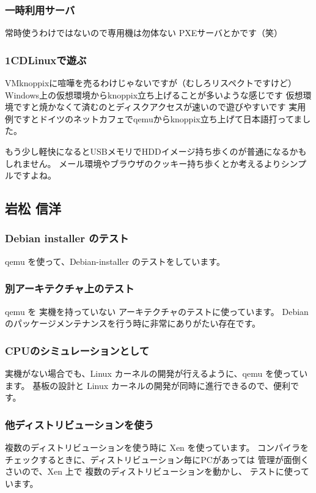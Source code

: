 \documentclass[mingoth,a4paper]{jsarticle}
\begin{document}
\subsubsection{一時利用サーバ}
常時使うわけではないので専用機は勿体ない
PXEサーバとかです（笑）

\subsubsection{1CDLinuxで遊ぶ}
VMknoppixに喧嘩を売るわけじゃないですが（むしろリスペクトですけど）
Windows上の仮想環境からknoppix立ち上げることが多いような感じです
仮想環境ですと焼かなくて済むのとディスクアクセスが速いので遊びやすいです
実用例ですとドイツのネットカフェでqemuからknoppix立ち上げて日本語打ってました。

もう少し軽快になるとUSBメモリでHDDイメージ持ち歩くのが普通になるかもしれません。
メール環境やブラウザのクッキー持ち歩くとか考えるよりシンプルですよね。

\subsection{岩松 信洋}

\subsubsection{Debian installer のテスト}
 qemu を使って、Debian-installer のテストをしています。

\subsubsection{別アーキテクチャ上のテスト}
 qemu を 実機を持っていない アーキテクチャのテストに使っています。
 Debian のパッケージメンテナンスを行う時に非常にありがたい存在です。

\subsubsection{CPUのシミュレーションとして}
 実機がない場合でも、Linux カーネルの開発が行えるように、qemu を使っています。
 基板の設計と Linux カーネルの開発が同時に進行できるので、便利です。

\subsubsection{他ディストリビューションを使う}
 複数のディストリビューションを使う時に Xen を使っています。
 コンパイラをチェックするときに、ディストリビューション毎にPCがあっては
 管理が面倒くさいので、Xen 上で 複数のディストリビューションを動かし、
 テストに使っています。
\end{document}
